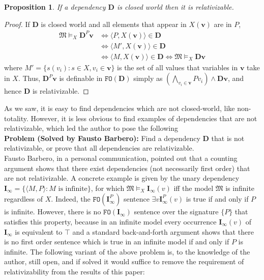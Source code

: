 \documentclass{article}
\newtheorem{Proposition}[Theorem]{Proposition}
\theoremstyle{definition}
\newcommand{\tuple}{\mathbf}
\newcommand{\FO}{\texttt{FO}}
\newcommand{\M}{\mathfrak M}
\newcommand{\D}{\mathbf D}
\begin{document}
\begin{Proposition}
	If a dependency $\D$ is closed world then it is relativizable.
\end{Proposition}
\begin{proof}
	If $\D$ is closed world and all elements that appear in $X(\tuple v)$ are in $P$, 
	\begin{align*}
		\M \models_X \D^P \tuple v & %
		\Leftrightarrow \langle P, X(\tuple v)\rangle \in \D\\%
		& \Leftrightarrow \langle M', X(\tuple v)\rangle \in \D\\%
		& \Leftrightarrow \langle M, X(\tuple v)\rangle \in \D%
		\Leftrightarrow \M \models_X \D \tuple v 
	\end{align*}
	where $M' = \{s(v_i) : s \in X, v_i \in \tuple v\}$ is the set of all values that variables in $\tuple v$ take in $X$. Thus, $\D^P \tuple v$ is definable in $\FO(\D)$ simply as $\left(\bigwedge_{v_i \in \tuple v} P v_i\right) \wedge \D \tuple v$, and hence $\D$ is relativizable. 
\end{proof}

As we saw, it is easy to find dependencies which are not closed-world, like non-totality. However, it is less obvious to find examples of dependencies that are not relativizable, which led the author to pose the following\\

\noindent \textbf{Problem (Solved by Fausto Barbero):} Find a dependency $\D$ that is not relativizable, or prove that all dependencies are relativizable.\\

Fausto Barbero, in a personal communication, pointed out that a counting argument shows that there exist dependencies (not necessarily first order) that are not relativizable. A concrete example is given by the unary dependency $\mathbf{I}_\infty = \{\langle M, P\rangle: M \text{ is infinite}\}$, for which $\M \models_X \mathbf{I}_\infty(v)$ iff the model $\M$ is infinite regardless of $X$. Indeed, the $\FO(\mathbf{I}_\infty^{P})$ sentence $\exists v \mathbf{I}_\infty^P(v)$ is true if and only if $P$ is infinite. However, there is no $\FO(\mathbf{I}_\infty)$ sentence over the signature $\{P\}$ that satisfies this property, because in an infinite model every occurrence $\mathbf{I}_\infty(v)$ of $\mathbf{I}_\infty$ is equivalent to $\top$ and a standard back-and-forth argument shows that there is no first order sentence which is true in an infinite model if and only if $P$ is infinite. The following variant of the above problem is, to the knowledge of the author, still open, and if solved it would suffice to remove the requirement of relativizability from the results of this paper:\\
\end{document}

